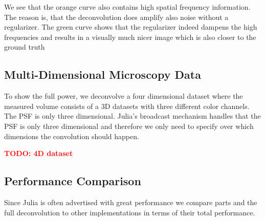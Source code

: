 \documentclass{juliacon}
\newcommand\todo[1]{\textcolor{red}{\textbf{TODO: #1}}}
\begin{document}
        We see that the orange curve also contains high spatial frequency information. The reason is, that the deconvolution does amplify also noise
        without a regularizer. The green curve shows that the regularizer indeed dampens the high frequencies and results in a visually much
        nicer image which is also closer to the ground truth

    \subsection{Multi-Dimensional Microscopy Data}
        To show the full power, we deconvolve a four dimensional dataset where the measured volume consists of a 3D datasets
        with three different color channels. The PSF is only three dimensional.
        Julia's broadcast mechanism handles that the PSF is only three dimensional and therefore
        we only need to specify over which dimensions the convolution should happen.
        
        \todo{4D dataset}
            


    \subsection{Performance Comparison}
        Since Julia is often advertised with great performance we compare parts and the full deconvolution to other implementations in
        terms of their total performance.
\end{document}
